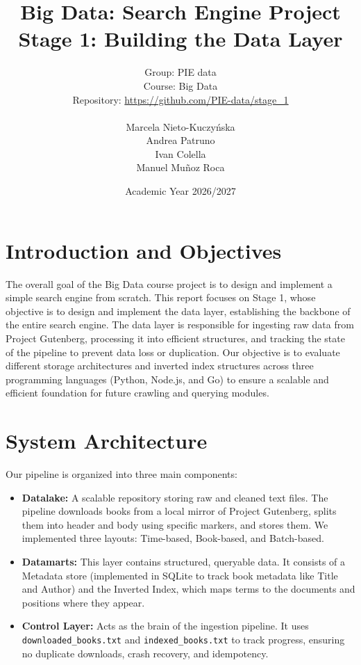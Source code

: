 \documentclass[12pt,a4paper]{article}
\title{Big Data: Search Engine Project \\ Stage 1: Building the Data Layer}
\author{
	Group: PIE data \\
	Course: Big Data \\
	Repository: \url{https://github.com/PIE-data/stage_1} \\
	\\
	Marcela Nieto-Kuczyńska \\
	Andrea Patruno \\
	Ivan Colella \\
	Manuel Muñoz Roca
}
\date{Academic Year 2026/2027}
\begin{document}
	
	\maketitle
	
	\section{Introduction and Objectives}
	The overall goal of the Big Data course project is to design and implement a simple search engine from scratch. This report focuses on Stage 1, whose objective is to design and implement the data layer, establishing the backbone of the entire search engine. The data layer is responsible for ingesting raw data from Project Gutenberg, processing it into efficient structures, and tracking the state of the pipeline to prevent data loss or duplication. Our objective is to evaluate different storage architectures and inverted index structures across three programming languages (Python, Node.js, and Go) to ensure a scalable and efficient foundation for future crawling and querying modules.
	
	\section{System Architecture}
	Our pipeline is organized into three main components:
	\begin{itemize}
		\item \textbf{Datalake:} A scalable repository storing raw and cleaned text files. The pipeline downloads books from a local mirror of Project Gutenberg, splits them into header and body using specific markers, and stores them. We implemented three layouts: Time-based, Book-based, and Batch-based.
		\item \textbf{Datamarts:} This layer contains structured, queryable data. It consists of a Metadata store (implemented in SQLite to track book metadata like Title and Author) and the Inverted Index, which maps terms to the documents and positions where they appear.
		\item \textbf{Control Layer:} Acts as the brain of the ingestion pipeline. It uses \texttt{downloaded\_books.txt} and \texttt{indexed\_books.txt} to track progress, ensuring no duplicate downloads, crash recovery, and idempotency.
	\end{itemize}
	
\end{document}
